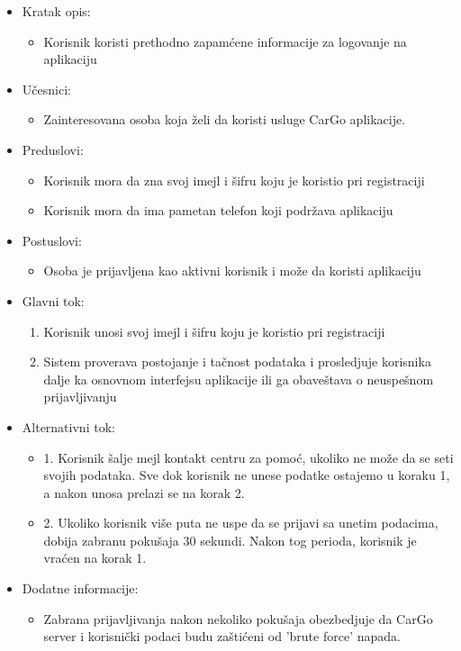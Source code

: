 \begin{itemize}
    \item Kratak opis:
        \begin{itemize}
            \item Korisnik koristi prethodno zapamćene informacije za logovanje na aplikaciju
        \end{itemize}
    \item Učesnici:
        \begin{itemize}
            \item Zainteresovana osoba koja želi da koristi usluge CarGo aplikacije.
        \end{itemize}
    \item Preduslovi:
        \begin{itemize}
            \item Korisnik mora da zna svoj imejl i šifru koju je koristio pri registraciji
            \item Korisnik mora da ima pametan telefon koji podržava aplikaciju
        \end{itemize}
    \item Postuslovi:
        \begin{itemize}
            \item Osoba je prijavljena kao aktivni korisnik i može da koristi aplikaciju
        \end{itemize}
    \item Glavni tok:
        \begin{enumerate}
            \item Korisnik unosi svoj imejl i šifru koju je koristio pri registraciji
            \item Sistem proverava postojanje i tačnost podataka i prosledjuje korisnika dalje ka osnovnom interfejsu aplikacije ili ga obaveštava o neuspešnom prijavljivanju
        \end{enumerate}
    \item Alternativni tok:
        \begin{itemize}
            \item 1. Korisnik šalje mejl kontakt centru za pomoć, ukoliko ne može da se seti svojih podataka. Sve dok korisnik ne unese podatke ostajemo u koraku 1, a nakon unosa prelazi se na korak 2.
            \item 2. Ukoliko korisnik više puta ne uspe da se prijavi sa unetim podacima, dobija zabranu pokušaja 30 sekundi. Nakon tog perioda, korisnik je vraćen na korak 1.
        \end{itemize}
    \item Dodatne informacije:
        \begin{itemize}
            \item Zabrana prijavljivanja nakon nekoliko pokušaja obezbedjuje da CarGo server i korisnički podaci budu zaštićeni od 'brute force' napada.
        \end{itemize}
\end{itemize}


